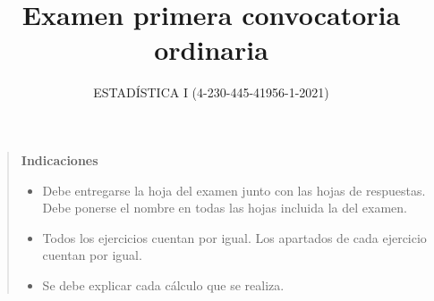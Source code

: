 \documentclass[]{article}
\title{Examen primera convocatoria ordinaria}
\author{ESTADÍSTICA I (4-230-445-41956-1-2021)}
\date{}
\theoremstyle{plain}
\theoremstyle{definition}
\theoremstyle{definition} %
\begin{document}
\maketitle

\begin{quotation}
  \textbf{Indicaciones}
  \begin{itemize}
    \item Debe entregarse la hoja del examen junto con las hojas de respuestas. Debe ponerse el nombre en todas las hojas incluida la del examen.
    \item Todos los ejercicios cuentan por igual. Los apartados de cada ejercicio cuentan por igual.
    \item Se debe explicar cada cálculo que se realiza.
  \end{itemize}
\end{quotation}
\end{document}
